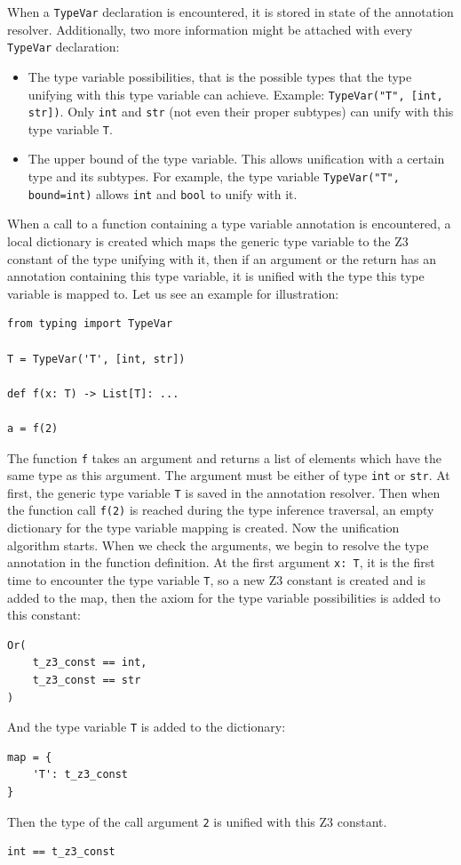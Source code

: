 When a \lstinline|TypeVar| declaration is encountered, it is stored in state of the annotation resolver. Additionally, two more information might be attached with every \lstinline|TypeVar| declaration:
\begin{itemize}
	\item The type variable possibilities, that is the possible types that the type unifying with this type variable can achieve. Example: \lstinline|TypeVar("T", [int, str])|. Only \lstinline|int| and \lstinline|str| (not even their proper subtypes) can unify with this type variable \lstinline|T|.
	\item The upper bound of the type variable. This allows unification with a certain type and its subtypes. For example, the type variable \lstinline|TypeVar("T", bound=int)| allows \lstinline|int| and \lstinline|bool| to unify with it.
\end{itemize}

When a call to a function containing a type variable annotation is encountered, a local dictionary is created which maps the generic type variable to the Z3 constant of the type unifying with it, then if an argument or the return has an annotation containing this type variable, it is unified with the type this type variable is mapped to. Let us see an example for illustration:

\begin{lstlisting}
from typing import TypeVar

T = TypeVar('T', [int, str])

def f(x: T) -> List[T]: ...

a = f(2)
\end{lstlisting}

The function \lstinline|f| takes an argument and returns a list of elements which have the same type as this argument. The argument must be either of type \lstinline|int| or \lstinline|str|. At first, the generic type variable \lstinline|T| is saved in the annotation resolver. Then when the function call \lstinline|f(2)| is reached during the type inference traversal, an empty dictionary for the type variable mapping is created. Now the unification algorithm starts. When we check the arguments, we begin to resolve the type annotation in the function definition. At the first argument \lstinline|x: T|, it is the first time to encounter the type variable \lstinline|T|, so a new Z3 constant is created and is added to the map, then the axiom for the type variable possibilities is added to this constant:
\begin{lstlisting}
Or(
	t_z3_const == int,
	t_z3_const == str
)
\end{lstlisting}
And the type variable \lstinline|T| is added to the dictionary:
\begin{lstlisting}
map = {
	'T': t_z3_const
}
\end{lstlisting}
Then the type of the call argument \lstinline|2| is unified with this Z3 constant.
\begin{lstlisting}
int == t_z3_const
\end{lstlisting}

